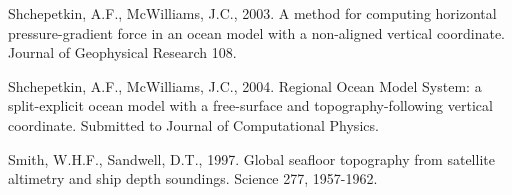 Shchepetkin, A.F., McWilliams, J.C.,
2003.
A method for computing horizontal pressure-gradient force
in an ocean model with a non-aligned vertical coordinate.
Journal of Geophysical Research
108.

Shchepetkin, A.F., McWilliams, J.C.,
2004.
Regional Ocean Model System: a split-explicit ocean model with a
free-surface and topography-following vertical coordinate.
Submitted to Journal of Computational Physics.

Smith, W.H.F., Sandwell, D.T.,
1997.
Global seafloor topography from satellite altimetry and ship depth soundings.
Science
277,
1957-1962.
